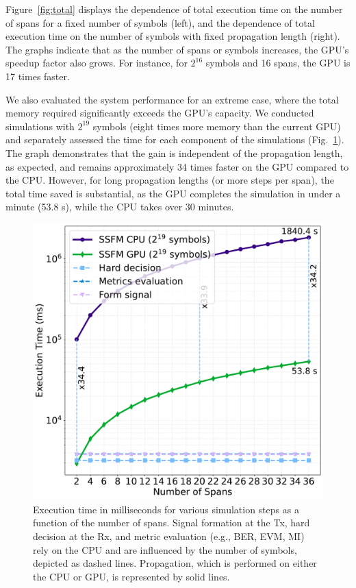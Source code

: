 Figure~\ref{fig:total} displays the dependence of total execution time on the number of spans for a fixed number of symbols (left), and the dependence of total execution time on the number of symbols with fixed propagation length (right). The graphs indicate that as the number of spans or symbols increases, the GPU's speedup factor also grows. For instance, for $2^{16}$ symbols and 16 spans, the GPU is 17 times faster.

We also evaluated the system performance for an extreme case, where the total memory required significantly exceeds the GPU's capacity. We conducted simulations with $2^{19}$ symbols (eight times more memory than the current GPU) and separately assessed the time for each component of the simulations (Fig.~\ref{fig:propagation_time}). The graph demonstrates that the gain is independent of the propagation length, as expected, and remains approximately 34 times faster on the GPU compared to the CPU. However, for long propagation lengths (or more steps per span), the total time saved is substantial, as the GPU completes the simulation in under a minute (53.8 s), while the CPU takes over 30 minutes.

\begin{figure}[t]
   \centering
        \includegraphics[width=0.6\linewidth]{images/hpcom/propagation.pdf}
    \caption{Execution time in milliseconds for various simulation steps as a function of the number of spans. Signal formation at the Tx, hard decision at the Rx, and metric evaluation (e.g., BER, EVM, MI) rely on the CPU and are influenced by the number of symbols, depicted as dashed lines. Propagation, which is performed on either the CPU or GPU, is represented by solid lines.}
    \label{fig:propagation_time}
\end{figure}


